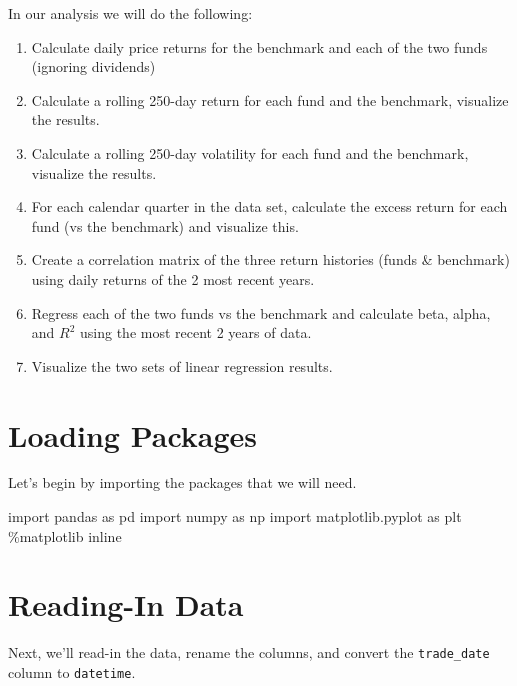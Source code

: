 \documentclass[
  letterpaper,
  DIV=11,
  numbers=noendperiod]{scrreprt}
\newenvironment{Shaded}{\begin{snugshade}}{\end{snugshade}}
\newcommand{\ImportTok}[1]{\textcolor[rgb]{0.00,0.46,0.62}{#1}}
\newcommand{\NormalTok}[1]{\textcolor[rgb]{0.00,0.23,0.31}{#1}}
\newcommand{\OperatorTok}[1]{\textcolor[rgb]{0.37,0.37,0.37}{#1}}
\providecommand{\tightlist}{%
  \setlength{\itemsep}{0pt}\setlength{\parskip}{0pt}}\usepackage{longtable,booktabs,array}
\begin{document}
In our analysis we will do the following:

\begin{enumerate}
\def\labelenumi{\arabic{enumi}.}
\tightlist
\item
  Calculate daily price returns for the benchmark and each of the two
  funds (ignoring dividends)
\item
  Calculate a rolling 250-day return for each fund and the benchmark,
  visualize the results.
\item
  Calculate a rolling 250-day volatility for each fund and the
  benchmark, visualize the results.
\item
  For each calendar quarter in the data set, calculate the excess return
  for each fund (vs the benchmark) and visualize this.
\item
  Create a correlation matrix of the three return histories (funds \&
  benchmark) using daily returns of the 2 most recent years.
\item
  Regress each of the two funds vs the benchmark and calculate beta,
  alpha, and \(R^2\) using the most recent 2 years of data.
\item
  Visualize the two sets of linear regression results.
\end{enumerate}

\hypertarget{loading-packages-7}{%
\section{Loading Packages}\label{loading-packages-7}}

Let's begin by importing the packages that we will need.

\begin{Shaded}
\begin{Highlighting}[]
\ImportTok{import}\NormalTok{ pandas }\ImportTok{as}\NormalTok{ pd}
\ImportTok{import}\NormalTok{ numpy }\ImportTok{as}\NormalTok{ np}
\ImportTok{import}\NormalTok{ matplotlib.pyplot }\ImportTok{as}\NormalTok{ plt}
\OperatorTok{\%}\NormalTok{matplotlib inline}
\end{Highlighting}
\end{Shaded}

\hypertarget{reading-in-data-11}{%
\section{Reading-In Data}\label{reading-in-data-11}}

Next, we'll read-in the data, rename the columns, and convert the
\texttt{trade\_date} column to \texttt{datetime}.
\end{document}
